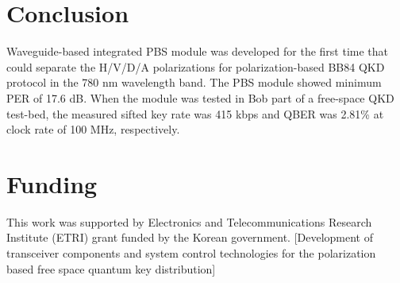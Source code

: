 \documentclass[letterpaper, 10pt]{article}
\begin{document}
\section{Conclusion}
Waveguide-based integrated PBS module was developed for the first time that could separate the H/V/D/A polarizations for polarization-based BB84 QKD protocol in the 780 nm wavelength band.
The PBS module showed minimum PER of 17.6 dB.
When the module was tested in Bob part of a free-space QKD test-bed, the measured sifted key rate was 415 kbps and QBER was 2.81\% at clock rate of 100 MHz, respectively.


\section*{Funding}
This work was supported by Electronics and Telecommunications Research Institute (ETRI) grant funded by the Korean government. [Development of transceiver components and system control technologies for the polarization based free space quantum key distribution]
\end{document}
